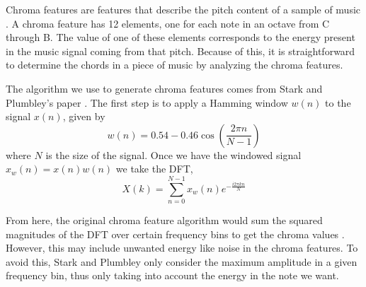 \documentclass[journal]{IEEEtran}
\begin{document}
Chroma features are features that describe the pitch content of a sample of music \cite{jiang}.
A chroma feature has 12 elements, one for each note in an octave from C through B.
The value of one of these elements corresponds to the energy present in the music signal coming from that pitch.
Because of this, it is straightforward to determine the chords in a piece of music by analyzing the chroma features.

The algorithm we use to generate chroma features comes from Stark and Plumbley’s paper \cite{stark}.
The first step is to apply a Hamming window $w(n)$ to the signal $x(n)$, given by
\begin{equation}
    w(n) = 0.54 - 0.46\cos\!\left(\frac{2\pi n}{N - 1}\right)
    \label{eq:window}
\end{equation}
where $N$ is the size of the signal.
Once we have the windowed signal $x_w(n) = x(n)w(n)$ we take the DFT,
\begin{equation}
    X(k) = \sum_{n = 0}^{N - 1}x_w(n)e^{-\frac{i2\pi kn}{N}}
    \label{eq:dft}
\end{equation}

From here, the original chroma feature algorithm would sum the squared magnitudes of the DFT over certain frequency bins to get the chroma values \cite{fujishima}.
However, this may include unwanted energy like noise in the chroma features.
To avoid this, Stark and Plumbley only consider the maximum amplitude in a given frequency bin, thus only taking into account the energy in the note we want.
\end{document}
